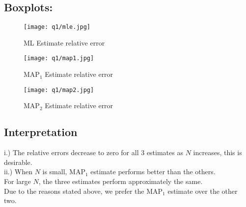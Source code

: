 \documentclass[11pt, fleqn]{article}
\begin{document}
\subsection*{Boxplots:}

\begin{figure}[H]
    \centering
    \texttt{[image: q1/mle.jpg]}
    \caption{ML Estimate relative error}
\end{figure}

\newpage

\begin{figure}[H]
    \centering
    \texttt{[image: q1/map1.jpg]}
    \caption{MAP$_1$ Estimate relative error}
\end{figure}

\begin{figure}[H]
    \centering
    \texttt{[image: q1/map2.jpg]}
    \caption{MAP$_2$ Estimate relative error}
\end{figure}

\subsection*{Interpretation}
i.) The relative errors decrease to zero for all 3 estimates as $N$ increases, this is desirable.\\
ii.) When $N$ is small, MAP$_1$ estimate performs better than the others.\\
For large $N$, the three estimates perform approximately the same.\\
Due to the reasons stated above, we prefer the MAP$_1$ estimate over the other two.
\end{document}

